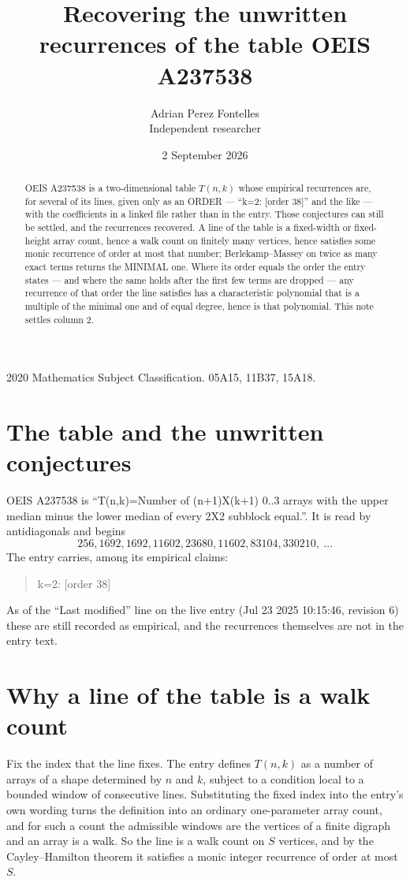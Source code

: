 \documentclass[11pt,a4paper]{article}
\title{Recovering the unwritten recurrences of the table OEIS A237538}
\author{Adrian Perez Fontelles\\ \small Independent researcher}
\date{2 September 2026}
\theoremstyle{plain}
\theoremstyle{definition}
\begin{document}
\maketitle

\begin{abstract}
OEIS A237538 is a two-dimensional table $T(n,k)$ whose empirical recurrences are, for several of
its lines, given only as an ORDER --- ``k=2: [order 38]'' and the like --- with the
coefficients in a linked file rather than in the entry. Those conjectures can still be settled,
and the recurrences recovered. A line of the table is a fixed-width or fixed-height array
count, hence a walk count on finitely many vertices, hence satisfies some monic recurrence of
order at most that number; Berlekamp--Massey on twice as many exact terms returns the MINIMAL
one. Where its order equals the order the entry states --- and where the same holds after the
first few terms are dropped --- any recurrence of that order the line satisfies has a
characteristic polynomial that is a multiple of the minimal one and of equal degree, hence is
that polynomial. This note settles column 2.
\end{abstract}

\noindent\small 2020 Mathematics Subject Classification. 05A15, 11B37, 15A18.\normalsize

\section{The table and the unwritten conjectures}

OEIS A237538 is ``T(n,k)=Number of (n+1)X(k+1) 0..3 arrays with the upper median minus the lower median of every 2X2 subblock equal.''. It is read by antidiagonals and begins
\[
256, 1692, 1692, 11602, 23680, 11602, 83104, 330210,\ \dots
\]
The entry carries, among its empirical claims:
\begin{quote}\small
k=2: [order 38]
\end{quote}
As of the ``Last modified'' line on the live entry (Jul 23 2025 10:15:46, revision 6) these are still
recorded as empirical, and the recurrences themselves are not in the entry text.

\section{Why a line of the table is a walk count}

Fix the index that the line fixes. The entry defines $T(n,k)$ as a number of arrays of a shape
determined by $n$ and $k$, subject to a condition local to a bounded window of consecutive
lines. Substituting the fixed index into the entry's own wording turns the definition into an
ordinary one-parameter array count, and for such a count the admissible windows are the
vertices of a finite digraph and an array is a walk. So the line is a walk count on $S$
vertices, and by the Cayley--Hamilton theorem it satisfies a monic integer recurrence of order
at most $S$.
\end{document}
